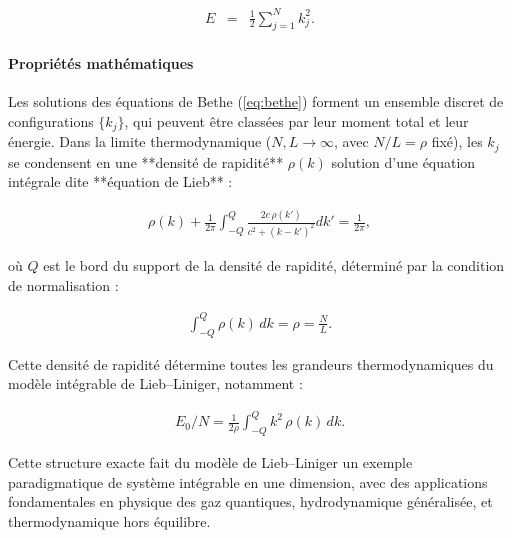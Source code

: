 \begin{eqnarray}
	E & = & \frac{1}{2} \sum_{j=1}^N k_j^2.
\end{eqnarray}

\paragraph{Propriétés mathématiques}

Les solutions des équations de Bethe (\ref{eq:bethe}) forment un ensemble discret de configurations \(\{k_j\}\), qui peuvent être classées par leur moment total et leur énergie. Dans la limite thermodynamique (\(N, L \to \infty\), avec \(N/L = \rho\) fixé), les \(k_j\) se condensent en une **densité de rapidité** \(\rho(k)\) solution d’une équation intégrale dite **équation de Lieb** :

\begin{eqnarray}
	\rho(k) + \frac{1}{2\pi} \int_{-Q}^{Q} \frac{2c\, \rho(k')}{c^2 + (k - k')^2} dk' = \frac{1}{2\pi},
\end{eqnarray}

où \(Q\) est le bord du support de la densité de rapidité, déterminé par la condition de normalisation :

\begin{eqnarray}
	\int_{-Q}^{Q} \rho(k)\, dk = \rho = \frac{N}{L}.
\end{eqnarray}

Cette densité de rapidité détermine toutes les grandeurs thermodynamiques du modèle intégrable de Lieb–Liniger, notamment :

\begin{eqnarray}
	E_0/N = \frac{1}{2\rho} \int_{-Q}^{Q} k^2\, \rho(k)\, dk.
\end{eqnarray}

\vspace{1em}
Cette structure exacte fait du modèle de Lieb–Liniger un exemple paradigmatique de système intégrable en une dimension, avec des applications fondamentales en physique des gaz quantiques, hydrodynamique généralisée, et thermodynamique hors équilibre.
